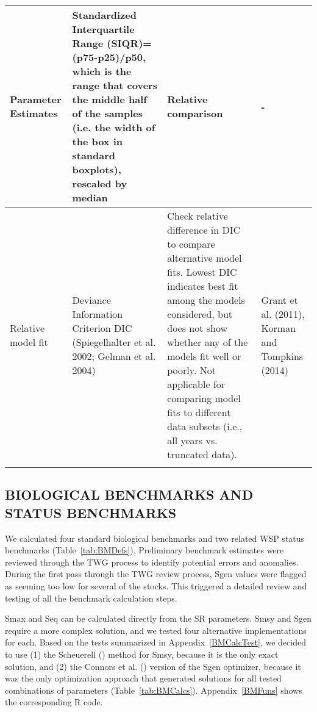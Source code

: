 \documentclass[french,11pt]{book}
\begin{document}
\begin{longtable}[t]{>{\raggedright\arraybackslash}p{7em}>{\raggedright\arraybackslash}p{10em}>{\raggedright\arraybackslash}p{17em}>{\raggedright\arraybackslash}p{5em}}
\midrule Parameter Estimates & Standardized Interquartile Range (SIQR)= (p75-p25)/p50, which is the range that covers the middle half of the samples (i.e. the width of the box in standard boxplots), rescaled by median & Relative comparison & -\\
\midrule Relative model fit & Deviance Information Criterion DIC (Spiegelhalter et al. 2002; Gelman et al. 2004) & Check relative difference in DIC to compare alternative model fits. Lowest DIC indicates best fit among the models considered, but does not show whether any of the models fit well or poorly. Not applicable for comparing model fits to different data subsets (i.e., all years vs. truncated data). & Grant et al. (2011), Korman and Tompkins (2014)\\* \end{longtable}

\endgroup{} \endgroup{}

\clearpage

\subsection{BIOLOGICAL BENCHMARKS AND STATUS BENCHMARKS}\label{BMMethods}

We calculated four standard biological benchmarks and two related WSP status benchmarks (Table~\ref{tab:BMDefs}). Preliminary benchmark estimates were reviewed through the TWG process to identify potential errors and anomalies. During the first pass through the TWG review process, Sgen values were flagged as seeming too low for several of the stocks. This triggered a detailed review and testing of all the benchmark calculation steps.

Smax and Seq can be calculated directly from the SR parameters. Smsy and Sgen require a more complex solution, and we tested four alternative implementations for each. Based on the tests summarized in Appendix~\ref{BMCalcTest}, we decided to use (1) the Scheuerell () method for Smsy, because it is the only exact solution, and (2) the Connors et al. () version of the Sgen optimizer, because it was the only optimization approach that generated solutions for all tested combinations of parameters (Table~\ref{tab:BMCalcs}). Appendix~\ref{BMFuns} shows the corresponding R code.
\end{document}
